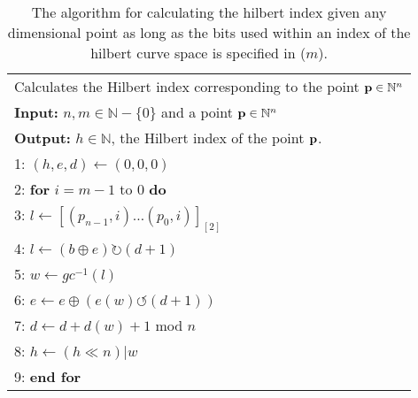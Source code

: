\documentclass[10pt]{article}
\begin{document}
\begin{table}
  
  \begin{tabular}{l}
    \hline
    Calculates the Hilbert index corresponding to the point ${\bf p} \in \mathbb{N}^n $ \\
    {\bf Input:} $n, m \in \mathbb{N} - \{0\} $ and a point ${\bf p} \in \mathbb{N}^n$ \\
    {\bf Output:} $h \in \mathbb{N}$, the Hilbert index of the point ${\bf p}$. \\
    1: $ \left( h, e, d \right) \leftarrow \left( 0, 0, 0 \right) $ \\
    2: {\bf for} $ i = m - 1 $ to $ 0 $ { \bf do} \\
    3: \qquad $ l \leftarrow \left[ \left( p_{n-1} , i \right) \ldots \left( p_0 , i \right) \right]_{\left[ 2 \right]} $ \\
    4: \qquad $ l \leftarrow \left( b \oplus e \right) \rightturn \left( d+1 \right)$ \\
    5: \qquad $ w \leftarrow gc^{-1} \left( l \right)$ \\
    6: \qquad $ e \leftarrow e \oplus \left( e \left( w \right) \leftturn \left( d+ 1 \right) \right) $ \\
    7: \qquad $ d \leftarrow d + d \left( w \right) + 1 $ mod $n$ \\
    8: \qquad $ h \leftarrow \left( h \ll n \right) | w $ \\
    9: {\bf end for} \\
    \hline
  \end{tabular}
  \caption{The algorithm for calculating the hilbert index given any dimensional point as long as the bits used within an index of the hilbert curve space is specified in ($m$). }
  \label{hilbert-point-to-index}
\end{table}
\end{document}
